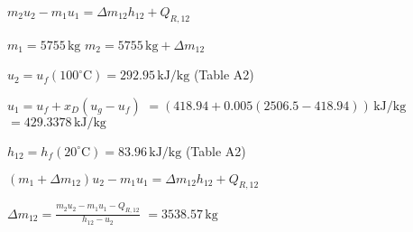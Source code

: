 \( m_2 u_2 - m_1 u_1 = \Delta m_{12} h_{12} + Q_{R,12} \)  

\( m_1 = 5755 \, \text{kg} \)  
\( m_2 = 5755 \, \text{kg} + \Delta m_{12} \)  

\( u_2 = u_{f} (100^\circ \text{C}) = 292.95 \, \text{kJ/kg} \) (Table A2)  

\( u_1 = u_{f} + x_D (u_{g} - u_{f}) \)  
\( = (418.94 + 0.005 (2506.5 - 418.94)) \, \text{kJ/kg} \)  
\( = 429.3378 \, \text{kJ/kg} \)  

\( h_{12} = h_{f} (20^\circ \text{C}) = 83.96 \, \text{kJ/kg} \) (Table A2)  

\( (m_1 + \Delta m_{12}) u_2 - m_1 u_1 = \Delta m_{12} h_{12} + Q_{R,12} \)  

\( \Delta m_{12} = \frac{m_2 u_2 - m_1 u_1 - Q_{R,12}}{h_{12} - u_2} \)  
\( = 3538.57 \, \text{kg} \)